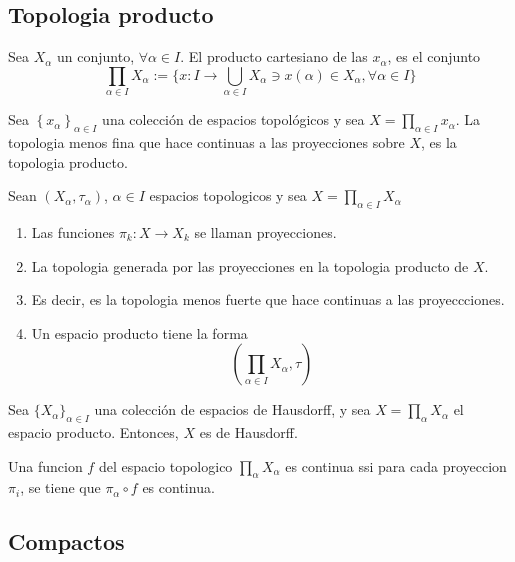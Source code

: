 \subsection*{Topologia producto}
Sea $X_\alpha$ un conjunto, $\forall \alpha \in I$. El producto cartesiano de las $x_\alpha$, es el conjunto 
$$\prod_{\alpha\in I} X_\alpha := \{x:I\to \bigcup_{\alpha\in I}X_\alpha \ni x(\alpha)\in X_\alpha, \forall \alpha \in I\}$$


\begin{definicion}
    Sea $\left\{x_\alpha \right\}_{\alpha \in I}$ una colección de espacios topológicos y sea $X=\prod_{\alpha \in I} x_\alpha$. La topologia menos fina que hace continuas a las proyecciones sobre $X$, es la topologia producto.
\end{definicion}


\begin{definicion}
    Sean $(X_\alpha,\tau_\alpha)$, $\alpha\in I$ espacios topologicos y sea $X=\prod_{\alpha\in I}X_\alpha$
    \begin{enumerate}
        \item Las funciones $\pi_k:X\to X_k$ se llaman proyecciones.
        \item La topologia generada por las proyecciones en la topologia producto de $X$. 
        \item Es decir, es la topologia menos fuerte que hace continuas a las proyeccciones. 
        \item Un espacio producto tiene la forma $$\left(\prod_{\alpha\in I} X_\alpha,\tau\right)$$
    \end{enumerate}
\end{definicion}

\begin{prop}
    Sea $\{X_\alpha\}_{\alpha\in I}$ una colección de espacios de Hausdorff, y sea $X=\prod_\alpha X_\alpha$ el espacio producto. Entonces, $X$ es de Hausdorff. 
\end{prop}

\begin{problema}
    Una funcion $f$ del espacio topologico $\prod_\alpha X_\alpha$ es continua ssi para  cada proyeccion $\pi_i$, se tiene que $\pi_\alpha \circ f$ es continua. 
\end{problema}

\subsection{Compactos}

